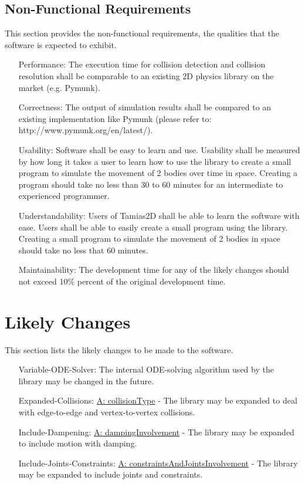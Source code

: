 \documentclass[12pt]{article}
\begin{document}
\subsection{Non-Functional Requirements}
\label{Sec:NFRs}
This section provides the non-functional requirements, the qualities that the software is expected to exhibit.

\begin{itemize}
\item[Performance:\phantomsection\label{performance}]{The execution time for collision detection and collision resolution shall be comparable to an existing 2D physics library on the market (e.g. Pymunk).}
\item[Correctness:\phantomsection\label{correctness}]{The output of simulation results shall be compared to an existing implementation like Pymunk (please refer to: http://www.pymunk.org/en/latest/).}
\item[Usability:\phantomsection\label{usability}]{Software shall be easy to learn and use. Usability shall be measured by how long it takes a user to learn how to use the library to create a small program to simulate the movement of 2 bodies over time in space. Creating a program should take no less than 30 to 60 minutes for an intermediate to experienced programmer.}
\item[Understandability:\phantomsection\label{understandability}]{Users of Tamias2D shall be able to learn the software with ease. Users shall be able to easily create a small program using the library. Creating a small program to simulate the movement of 2 bodies in space should take no less that 60 minutes.}
\item[Maintainability:\phantomsection\label{maintainability}]{The development time for any of the likely changes should not exceed 10$\%$ percent of the original development time.}
\end{itemize}
\section{Likely Changes}
\label{Sec:LCs}
This section lists the likely changes to be made to the software.

\begin{itemize}
\item[Variable-ODE-Solver:\phantomsection\label{lcVODES}]{The internal ODE-solving algorithm used by the library may be changed in the future.}
\item[Expanded-Collisions:\phantomsection\label{lcEC}]{\hyperref[assumpCT]{A: collisionType} - The library may be expanded to deal with edge-to-edge and vertex-to-vertex collisions.}
\item[Include-Dampening:\phantomsection\label{lcID}]{\hyperref[assumpDI]{A: dampingInvolvement} - The library may be expanded to include motion with damping.}
\item[Include-Joints-Constraints:\phantomsection\label{lcIJC}]{\hyperref[assumpCAJI]{A: constraintsAndJointsInvolvement} - The library may be expanded to include joints and constraints.}
\end{itemize}
\end{document}
